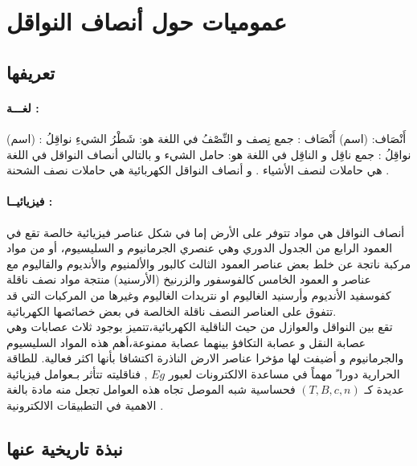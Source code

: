 \section{عموميات حول أنصاف النواقل}
\subsection{تعريفها }
\paragraph{لغـــة :}
أَنْصَاف: (اسم)
أَنْصَاف : جمع نِصف و النِّصْفُ في اللغة هو: شَطْرُ الشيءِ 
نواقِلُ : (اسم)
نواقِلُ : جمع ناقِل و الناقِل في اللغة هو: حامل الشيء
و بالتالي أنصاف النواقل في اللغة هي حاملات لنصف الأشياء .
و أنصاف النواقل الكهربائية هي حاملات نصف الشحنة . \cite{a1}

\paragraph{فيزيائيــا :}
أنصاف النواقل هي مواد تتوفر على الأرض إما في شكل عناصر فيزيائية خالصة تقع في العمود الرابع من الجدول الدوري وهي عنصري الجرمانيوم و السليسيوم، أو من مواد مركبة ناتجة عن خلط بعض عناصر العمود الثالث كالبور والألمنيوم والأنديوم والقاليوم مع عناصر و العمود الخامس كالفوسفور والزرنيخ 
(الأرسنيد) منتجة مواد نصف ناقلة كفوسفيد الأنديوم وأرسنيد الغاليوم او نتريدات الغاليوم وغيرها من المركبات التي قد تتفوق على العناصر النصف ناقلة الخالصة في بعض خصائصها الكهربائية.\\
تقع بين النواقل والعوازل من حيث الناقلية الكهربائية،تتميز بوجود ثلاث عصابات وهي عصابة النقل و عصابة التكافؤ بينهما عصابة ممنوعة،أهم هذه المواد السليسيوم والجرمانيوم و أضيفت لها مؤخرا عناصر الارض الناذرة اكتشافا بأنها اكثر فعالية. للطاقة الحرارية دورا ً مهماً في مساعدة الالكترونات لعبور $ Eg  $ , فناقليته تتأثر بـعوامل فيزيائية عديدة كـ $ ( T,B,c,n ) $ فحساسية شبه الموصل تجاه هذه العوامل تجعل منه مادة بالغة الاهمية في التطبيقات الالكترونية .

\subsection{نبذة تاريخية عنها }

